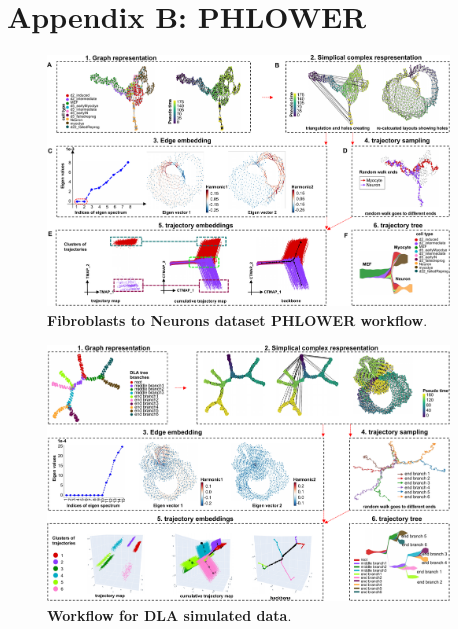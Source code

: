 \chapter{Appendix B: PHLOWER}
\label{chapter:appendixB}


\graphicspath{{appendix/figs}}

\begin{figure}[!ht]
  \centering
  \includegraphics[width=0.95\textwidth]{Fib2Neuron_PHLOWER/fig}
  \vspace{0.1cm}
  \caption[Fibroblasts to Neurons dataset PHLOWER workflow.]{\textbf{Fibroblasts to Neurons dataset PHLOWER workflow}.}
  \label{supfig:fib2neuron-workflow}
\end{figure}


\begin{figure}[!ht]
  \centering
  \includegraphics[width=0.95\textwidth]{DLA10_PHLOWER/fig}
  \vspace{0.1cm}
  \caption[Workflow for DLA simulated data.]{\textbf{Workflow for DLA simulated data}.}
  \label{supfig:dla10-workflow}
\end{figure}


